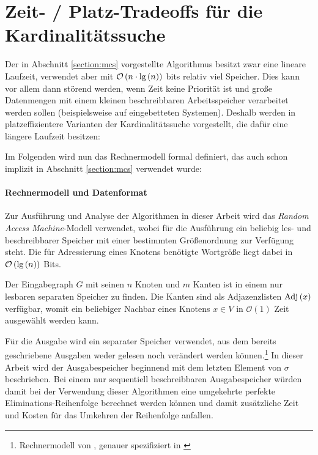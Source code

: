 \section{Zeit- / Platz-Tradeoffs für die Kardinalitätssuche}
Der in Abschnitt \ref{section:mcs} vorgestellte Algorithmus besitzt zwar eine lineare Laufzeit, verwendet aber mit \(\mathcal{O}\left( n \cdot \textnormal{lg} \left( n \right) \right) \) bits relativ viel Speicher. Dies kann vor allem dann störend werden, wenn Zeit keine Priorität ist und große Datenmengen mit einem kleinen beschreibbaren Arbeitsspeicher verarbeitet werden sollen (beispielsweise auf eingebetteten Systemen). Deshalb werden in \cite{sankardeep} platzeffizientere Varianten der Kardinalitätssuche vorgestellt, die dafür eine längere Laufzeit besitzen:

Im Folgenden wird nun das Rechnermodell formal definiert, das auch schon implizit in Abschnitt \ref{section:mcs} verwendet wurde:

\paragraph{Rechnermodell und Datenformat} Zur Ausführung und Analyse der Algorithmen in dieser Arbeit wird das \textit{Random Access Machine}-Modell verwendet, wobei für die Ausführung ein beliebig les- und beschreibbarer Speicher mit einer bestimmten Grö\-ßen\-ord\-nung zur Verfügung steht. Die für Adressierung eines Knotens benötigte Wortgröße liegt dabei in \( \mathcal{O} \left( \textnormal{lg} \left( n \right)\right) \) Bits.

Der Eingabegraph \( G \) mit seinen \( n \) Knoten und \( m \) Kanten ist in einem nur lesbaren separaten Speicher zu finden. Die Kanten sind als Adjazenzlisten \(\textnormal{Adj} \left( x \right) \)  verfügbar, womit ein beliebiger Nachbar eines Knotens \( x \in V \) in \( \mathcal{O} \left( 1 \right) \) Zeit ausgewählt werden kann.

Für die Ausgabe wird ein separater Speicher verwendet, aus dem bereits geschriebene Ausgaben weder gelesen noch verändert werden können.\footnote{Rechnermodell von \cite{sankardeep}, genauer spezifiziert in \cite{asano}} In dieser Arbeit wird der Ausgabespeicher beginnend mit dem letzten Element von \( \sigma \) beschrieben. Bei einem nur sequentiell beschreibbaren Ausgabespeicher würden damit bei der Verwendung dieser Algorithmen eine umgekehrte perfekte Eliminations-Reihenfolge berechnet werden können und damit zusätzliche Zeit und Kosten für das Umkehren der Reihenfolge anfallen.

